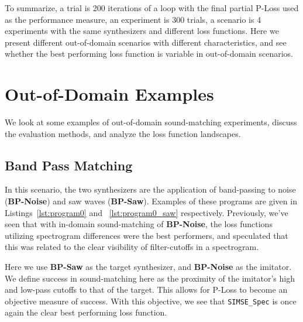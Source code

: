 \documentclass{article} %
\newcommand{\SIMSESpec}{\texttt{SIMSE\_Spec}\xspace}
\newcommand{\BPNoise}{\textbf{BP-Noise}\xspace}
\newcommand{\BPSaw}{\textbf{BP-Saw}\xspace}
\begin{document}
To summarize, a trial is 200 iterations of a loop with the final partial P-Loss used as the performance measure, an experiment is 300 trials, a scenario is 4 experiments with the same synthesizers and different loss functions. Here we present different out-of-domain scenarios with different characteristics, and see whether the best performing loss function is variable in out-of-domain scenarios.


\section{Out-of-Domain Examples}
We look at some examples of out-of-domain sound-matching experiments, discuss the evaluation methods, and analyze the loss function landscapes. 

\subsection{Band Pass Matching}
In this scenario, the two synthesizers are the application of band-passing to noise (\BPNoise) and saw waves (\BPSaw). Examples of these programs are given in Listings~\ref{lst:program0} and ~\ref{lst:program0_saw} respectively. Previously, we've seen that with in-domain sound-matching of \BPNoise, the loss functions utilizing spectrogram differences were the best performers, and speculated that this was related to the clear visibility of filter-cutoffs in a spectrogram. 
 
 Here we use \BPSaw as the target synthesizer, and \BPNoise as the imitator. We define success in sound-matching here as the proximity of the imitator's high and low-pass cutoffs to that of the target. This allows for P-Loss to become an objective measure of success. With this objective, we see that \SIMSESpec is once again the clear best performing loss function.
\end{document}
